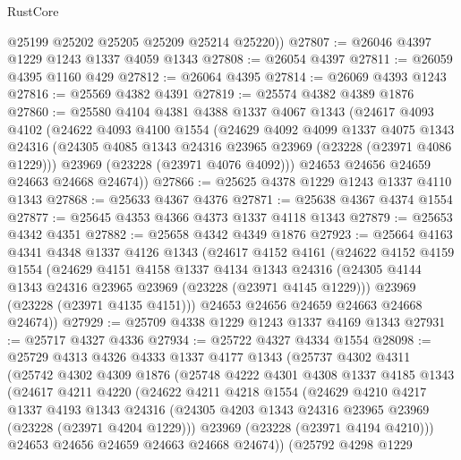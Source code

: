 \begin{lexlean}{RustCore}
\begin{coremodule}
        @25199
        @25202
        @25205
        @25209
        @25214
        @25220))
@27807 := @26046 @4397 @1229 @1243 @1337 @4059 @1343
@27808 := @26054 @4397
@27811 := @26059 @4395 @1160 @429
@27812 := @26064 @4395
@27814 := @26069 @4393 @1243
@27816 := @25569 @4382 @4391
@27819 := @25574 @4382 @4389 @1876
@27860 := @25580
    @4104
    @4381
    @4388
    @1337
    @4067
    @1343
    (@24617
      @4093
      @4102
      (@24622
        @4093
        @4100
        @1554
        (@24629
          @4092
          @4099
          @1337
          @4075
          @1343
          @24316
          (@24305 @4085 @1343 @24316 @23965 @23969 (@23228 (@23971 @4086 @1229)))
          @23969
          (@23228 (@23971 @4076 @4092)))
        @24653
        @24656
        @24659
        @24663
        @24668
        @24674))
@27866 := @25625 @4378 @1229 @1243 @1337 @4110 @1343
@27868 := @25633 @4367 @4376
@27871 := @25638 @4367 @4374 @1554
@27877 := @25645 @4353 @4366 @4373 @1337 @4118 @1343
@27879 := @25653 @4342 @4351
@27882 := @25658 @4342 @4349 @1876
@27923 := @25664
    @4163
    @4341
    @4348
    @1337
    @4126
    @1343
    (@24617
      @4152
      @4161
      (@24622
        @4152
        @4159
        @1554
        (@24629
          @4151
          @4158
          @1337
          @4134
          @1343
          @24316
          (@24305 @4144 @1343 @24316 @23965 @23969 (@23228 (@23971 @4145 @1229)))
          @23969
          (@23228 (@23971 @4135 @4151)))
        @24653
        @24656
        @24659
        @24663
        @24668
        @24674))
@27929 := @25709 @4338 @1229 @1243 @1337 @4169 @1343
@27931 := @25717 @4327 @4336
@27934 := @25722 @4327 @4334 @1554
@28098 := @25729
    @4313
    @4326
    @4333
    @1337
    @4177
    @1343
    (@25737
      @4302
      @4311
      (@25742
        @4302
        @4309
        @1876
        (@25748
          @4222
          @4301
          @4308
          @1337
          @4185
          @1343
          (@24617
            @4211
            @4220
            (@24622
              @4211
              @4218
              @1554
              (@24629
                @4210
                @4217
                @1337
                @4193
                @1343
                @24316
                (@24305 @4203 @1343 @24316 @23965 @23969 (@23228 (@23971 @4204 @1229)))
                @23969
                (@23228 (@23971 @4194 @4210)))
              @24653
              @24656
              @24659
              @24663
              @24668
              @24674))
          (@25792
            @4298
            @1229

\end{coremodule}
\end{lexlean}
